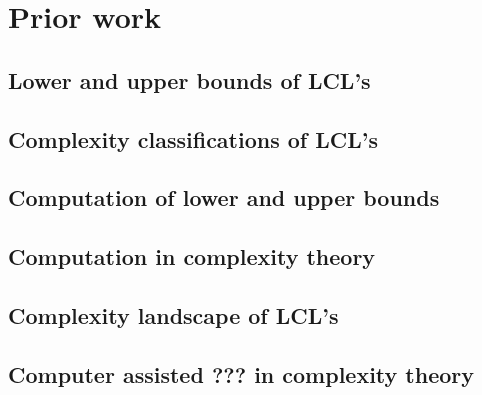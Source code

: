 
\section{Prior work} \label{sec:prior_work}


\subsection{Lower and upper bounds of LCL's}
\subsection{Complexity classifications of LCL's}
\subsection{Computation of lower and upper bounds}
\subsection{Computation in complexity theory}
\subsection{Complexity landscape of LCL's}
\subsection{Computer assisted ??? in complexity theory}
